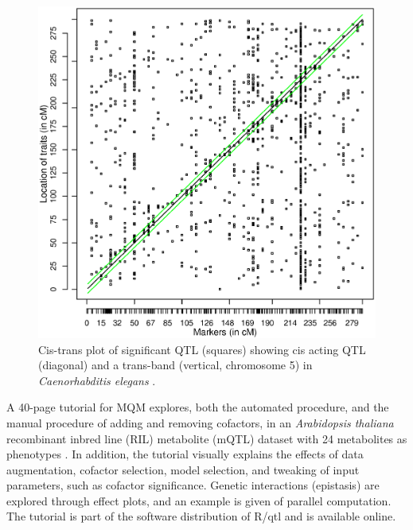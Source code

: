 \begin{figure}[h!]
  \centering
  \includegraphics[keepaspectratio,scale=0.30]{eps/image_3_2.eps}
  \caption[CisTrans plot.]{Cis-trans plot of significant QTL (squares) showing cis acting QTL (diagonal) 
          and a trans-band (vertical, chromosome 5) in {\it Caenorhabditis elegans} \citep{Li:2006}.}
  \label{fig:cistrans}
\end{figure}

A 40-page tutorial for MQM explores, both the automated procedure, and the manual procedure 
of adding and removing cofactors, in an \emph{Arabidopsis thaliana} recombinant inbred line 
(RIL) metabolite (mQTL) dataset with 24 metabolites as phenotypes \cite{Fu:2007}. In addition, 
the tutorial visually explains the effects of data augmentation, cofactor selection, model 
selection, and tweaking of input parameters, such as cofactor significance. Genetic interactions 
(epistasis) are explored through effect plots, and an example is given of parallel computation. 
The tutorial is part of the software distribution of R/qtl and is available online.

